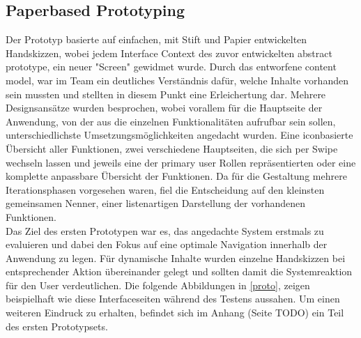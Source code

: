 \newpage
\subsection{Paperbased Prototyping}
Der Prototyp basierte auf einfachen, mit Stift und Papier entwickelten Handskizzen, wobei jedem Interface Context des zuvor entwickelten abstract prototype, ein neuer "Screen" gewidmet wurde. Durch das entworfene content model, war im Team ein deutliches Verständnis dafür, welche Inhalte vorhanden sein mussten und stellten in diesem Punkt eine Erleichertung dar. Mehrere Designsansätze wurden besprochen, wobei vorallem für die Hauptseite der Anwendung, von der aus die einzelnen Funktionalitäten aufrufbar sein sollen, unterschiedlichste Umsetzungsmöglichkeiten angedacht wurden. Eine iconbasierte Übersicht aller Funktionen, zwei verschiedene Hauptseiten, die sich per Swipe wechseln lassen und jeweils eine der primary user Rollen repräsentierten oder eine komplette anpassbare Übersicht der Funktionen. Da für die Gestaltung mehrere Iterationsphasen vorgesehen waren, fiel die Entscheidung auf den kleinsten gemeinsamen Nenner, einer listenartigen Darstellung der vorhandenen Funktionen.\\ 
Das Ziel des ersten Prototypen war es, das angedachte System erstmals zu evaluieren und dabei den Fokus auf eine optimale Navigation innerhalb der Anwendung zu legen. Für dynamische Inhalte wurden einzelne Handskizzen bei entsprechender Aktion übereinander gelegt und sollten damit die Systemreaktion für den User verdeutlichen. 
Die folgende Abbildungen in \ref{proto}, zeigen beispielhaft wie diese Interfaceseiten während des Testens aussahen. Um einen weiteren Eindruck zu erhalten, befindet sich im Anhang (Seite TODO) ein Teil des ersten Prototypsets.

